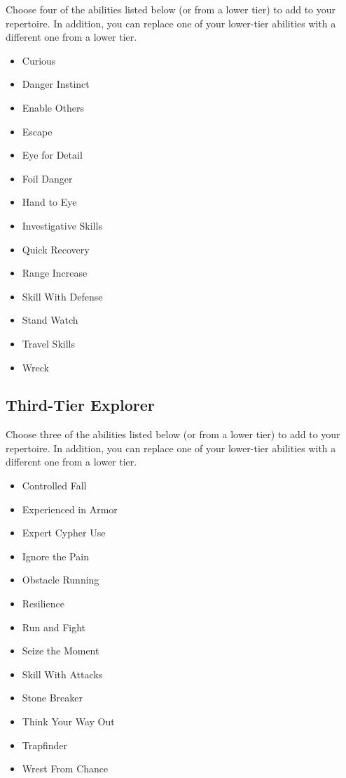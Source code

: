 Choose four of the abilities listed below (or from a lower tier) to add to your repertoire. In addition, you can replace one of your lower-tier abilities with a different one from a lower tier.

\begin{itemize}
\item Curious
\item Danger Instinct
\item Enable Others
\item Escape
\item Eye for Detail 
\item Foil Danger
\item Hand to Eye
\item Investigative Skills
\item Quick Recovery
\item Range Increase
\item Skill With Defense
\item Stand Watch
\item Travel Skills
\item Wreck
\end{itemize}

\subsection{Third-Tier Explorer}

Choose three of the abilities listed below (or from a lower tier) to add to your repertoire. In addition, you can replace one of your lower-tier abilities with a different one from a lower tier.

\begin{itemize}
\item Controlled Fall
\item Experienced in Armor
\item Expert Cypher Use
\item Ignore the Pain
\item Obstacle Running
\item Resilience
\item Run and Fight
\item Seize the Moment
\item Skill With Attacks
\item Stone Breaker
\item Think Your Way Out
\item Trapfinder
\item Wrest From Chance
\end{itemize}

